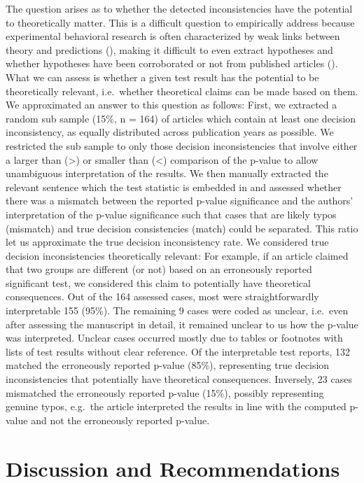 \documentclass[
  doc,
  longtable,
  nolmodern,
  notxfonts,
  notimes,
  colorlinks=true,linkcolor=blue,citecolor=blue,urlcolor=blue]{apa7}
\begin{document}
The question arises as to whether the detected inconsistencies have the
potential to theoretically matter. This is a difficult question to
empirically address because experimental behavioral research is often
characterized by weak links between theory and predictions
(), making it
difficult to even extract hypotheses and whether hypotheses have been
corroborated or not from published articles
(). What we can assess is
whether a given test result has the potential to be theoretically
relevant, i.e.~whether theoretical claims can be made based on them. We
approximated an answer to this question as follows: First, we extracted
a random sub sample (15\%, n = 164) of articles which contain at least
one decision inconsistency, as equally distributed across publication
years as possible. We restricted the sub sample to only those decision
inconsistencies that involve either a larger than (\textgreater) or
smaller than (\textless) comparison of the p-value to allow unambiguous
interpretation of the results. We then manually extracted the relevant
sentence which the test statistic is embedded in and assessed whether
there was a mismatch between the reported p-value significance and the
authors' interpretation of the p-value significance such that cases that
are likely typos (mismatch) and true decision consistencies (match)
could be separated. This ratio let us approximate the true decision
inconsistency rate. We considered true decision inconsistencies
theoretically relevant: For example, if an article claimed that two
groups are different (or not) based on an erroneously reported
significant test, we considered this claim to potentially have
theoretical consequences. Out of the 164 assessed cases, most were
straightforwardly interpretable 155 (95\%). The remaining 9 cases were
coded as unclear, i.e.~even after assessing the manuscript in detail, it
remained unclear to us how the p-value was interpreted. Unclear cases
occurred mostly due to tables or footnotes with lists of test results
without clear reference. Of the interpretable test reports, 132 matched
the erroneously reported p-value (85\%), representing true decision
inconsistencies that potentially have theoretical consequences.
Inversely, 23 cases mismatched the erroneously reported p-value (15\%),
possibly representing genuine typos, e.g.~the article interpreted the
results in line with the computed p-value and not the erroneously
reported p-value.

\section{Discussion and
Recommendations}\label{discussion-and-recommendations}
\end{document}
